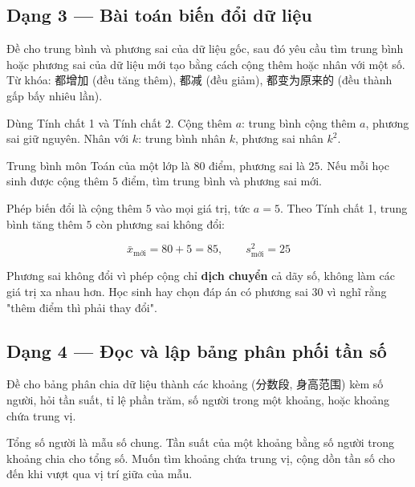 \documentclass[11pt, a4paper]{article}
\begin{document}
\subsection{Dạng 3 — Bài toán biến đổi dữ liệu}

 Đề cho trung bình và phương sai của dữ liệu gốc, sau đó yêu cầu tìm trung bình hoặc phương sai của dữ liệu mới tạo bằng cách cộng thêm hoặc nhân với một số. Từ khóa: 都增加 (đều tăng thêm), 都减 (đều giảm), 都变为原来的 (đều thành gấp bấy nhiêu lần).

 Dùng Tính chất 1 và Tính chất 2. Cộng thêm $a$: trung bình cộng thêm $a$, phương sai giữ nguyên. Nhân với $k$: trung bình nhân $k$, phương sai nhân $k^2$.

\begin{vidu}[{3}]
Trung bình môn Toán của một lớp là $80$ điểm, phương sai là $25$. Nếu mỗi học sinh được cộng thêm $5$ điểm, tìm trung bình và phương sai mới.

Phép biến đổi là cộng thêm $5$ vào mọi giá trị, tức $a = 5$. Theo Tính chất 1, trung bình tăng thêm $5$ còn phương sai không đổi:

$$\bar{x}_{\text{mới}} = 80 + 5 = 85, \qquad s^2_{\text{mới}} = 25$$

 Phương sai không đổi vì phép cộng chỉ \textbf{dịch chuyển} cả dãy số, không làm các giá trị xa nhau hơn. Học sinh hay chọn đáp án có phương sai $30$ vì nghĩ rằng "thêm điểm thì phải thay đổi".

\end{vidu}
\subsection{Dạng 4 — Đọc và lập bảng phân phối tần số}

 Đề cho bảng phân chia dữ liệu thành các khoảng (分数段, 身高范围) kèm số người, hỏi tần suất, tỉ lệ phần trăm, số người trong một khoảng, hoặc khoảng chứa trung vị.

 Tổng số người là mẫu số chung. Tần suất của một khoảng bằng số người trong khoảng chia cho tổng số. Muốn tìm khoảng chứa trung vị, cộng dồn tần số cho đến khi vượt qua vị trí giữa của mẫu.
\end{document}
